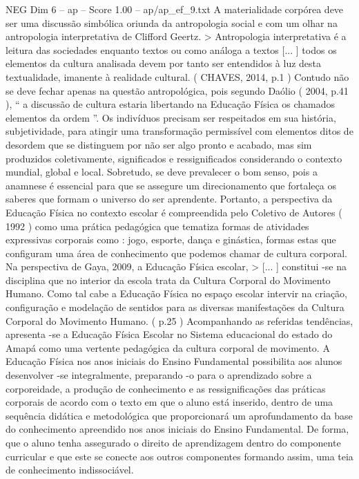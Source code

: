 \begin{textsample}{NEG Dim 6 – ap – Score 1.00 – ap/ap\_ef\_9.txt}
A materialidade corpórea deve ser uma discussão simbólica oriunda da antropologia social e com um olhar na antropologia interpretativa de Clifford Geertz. > Antropologia interpretativa é a leitura das sociedades enquanto textos ou como análoga a textos [... ] todos os elementos da cultura analisada devem por tanto ser entendidos à luz desta textualidade, imanente à realidade cultural. ( CHAVES, 2014, p.1 ) Contudo não se deve fechar apenas na questão antropológica, pois segundo Daólio ( 2004, p.41 ), “ a discussão de cultura estaria libertando na Educação Física os chamados elementos da ordem ”.
Os indivíduos precisam ser respeitados em sua história, subjetividade, para atingir uma transformação permissível com elementos ditos de desordem que se distinguem por não ser algo pronto e acabado, mas sim produzidos coletivamente, significados e ressignificados considerando o contexto mundial, global e local.
Sobretudo, se deve prevalecer o bom senso, pois a anamnese é essencial para que se assegure um direcionamento que fortaleça os saberes que formam o universo do ser aprendente.
Portanto, a perspectiva da Educação Física no contexto escolar é compreendida pelo Coletivo de Autores ( 1992 ) como uma prática pedagógica que tematiza formas de atividades expressivas corporais como : jogo, esporte, dança e ginástica, formas estas que configuram uma área de conhecimento que podemos chamar de cultura corporal.
Na perspectiva de Gaya, 2009, a Educação Física escolar, > [... ] constitui -se na disciplina que no interior da escola trata da Cultura Corporal do Movimento Humano.
Como tal cabe a Educação Física no espaço escolar intervir na criação, configuração e modelação de sentidos para as diversas manifestações da Cultura Corporal do Movimento Humano. ( p.25 ) Acompanhando as referidas tendências, apresenta -se a Educação Física Escolar no Sistema educacional do estado do Amapá como uma vertente pedagógica da cultura corporal de movimento.
A Educação Física nos anos iniciais do Ensino Fundamental possibilita aos alunos desenvolver -se integralmente, preparando -o para o aprendizado sobre a corporeidade, a produção de conhecimento e as ressignificações das práticas corporais de acordo com o texto em que o aluno está inserido, dentro de uma sequência didática e metodológica que proporcionará um aprofundamento da base do conhecimento apreendido nos anos iniciais do Ensino Fundamental.
De forma, que o aluno tenha assegurado o direito de aprendizagem dentro do componente curricular e que este se conecte aos outros componentes formando assim, uma teia de conhecimento indissociável.

\end{textsample}
